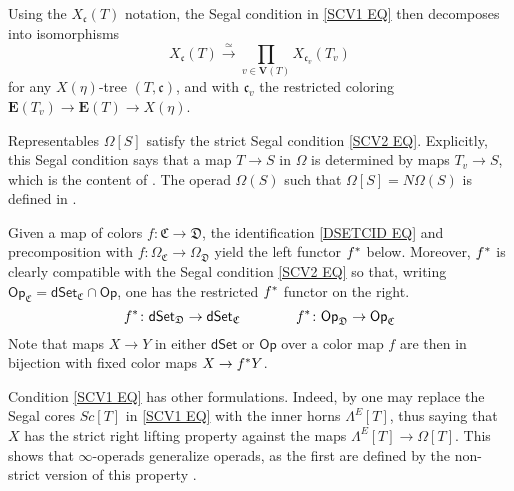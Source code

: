 \documentclass{hha}
\theoremstyle{definition} %
\newcommand{\Op}{\mathsf{Op}}
\newcommand{\dSet}{\mathsf{dSet}}
\begin{document}
Using the $X_{\mathfrak c}(T)$ notation, 
the Segal condition in \eqref{SCV1 EQ}
then decomposes into isomorphisms
	\begin{equation}\label{SCV2 EQ}
	X_{\mathfrak c}(T) \xrightarrow{\simeq} \prod_{v \in \boldsymbol{V}(T)} X_{\mathfrak c_v}(T_v)
	\end{equation}
for any $X(\eta)$-tree $(T,\mathfrak{c})$,
and with $\mathfrak{c}_v$
the restricted coloring
$\boldsymbol{E}(T_v) \to \boldsymbol{E}(T) \to X(\eta)$.


\begin{example}\label{OMTSEG EX}
	Representables $\Omega[S]$ satisfy
	the strict Segal condition \eqref{SCV2 EQ}.
	Explicitly, this Segal condition says
	that a map
	$T\to S$ in $\Omega$ is determined by maps
	$T_v\to S$, 
	which is the content of \cite[Prop. 5.11]{Per18}.
	The operad $\Omega(S)$
	such that $\Omega[S] = N \Omega(S)$
	is defined in \cite[\S 3]{MW07}.
\end{example}


\begin{remark}\label{PULLBACKS REM}
Given a map of colors 
$f \colon \mathfrak{C} \to \mathfrak{D}$,
the identification \eqref{DSETCID EQ}
and precomposition with 
$f\colon \Omega_\mathfrak{C} \to \Omega_\mathfrak{D}$
yield the left functor $f^{\**}$ below.
Moreover, $f^{\**}$ is clearly compatible with the Segal condition
\eqref{SCV2 EQ} so that, writing
$\Op_{\mathfrak{C}} = \dSet_{\mathfrak{C}} \cap \Op$,
one has the restricted $f^{\**}$ functor on the right.
\[
f^{\**} \colon \dSet_{\mathfrak{D}} \to \dSet_{\mathfrak{C}}
\qquad \qquad
f^{\**} \colon \Op_{\mathfrak{D}} \to \Op_{\mathfrak{C}}
\]
Note that maps $X \to Y$ in either $\dSet$ or $\Op$
over a color map $f$ are then in bijection with fixed color maps
$X \to f^{\**} Y$.
\end{remark}


\begin{remark}\label{SSCOTHER REM}
	Condition \eqref{SCV1 EQ} has other formulations.
	Indeed, by \cite[Props. 3.22, 3.31]{BP_edss}
	one may replace the Segal cores $Sc[T]$
	in \eqref{SCV1 EQ} with the inner horns $\Lambda^E[T]$,
	thus saying that $X$ has the strict
	right lifting property against the maps
	$\Lambda^E[T] \to \Omega[T]$.
	This shows that $\infty$-operads generalize operads,
	as the first are defined by the 
	non-strict version of this property \cite[\S 5]{MW09}.
\end{remark}
\end{document}
